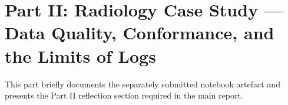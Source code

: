 \section{Part II: Radiology Case Study --- Data Quality, Conformance, and the Limits of Logs}
\label{sec:part2}

This part briefly documents the separately submitted notebook artefact and presents the Part II reflection section required in the main report.




